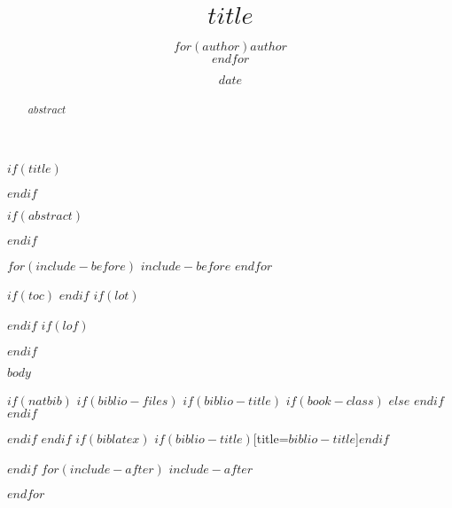 \documentclass[$if(fontsize)$$fontsize$,$endif$$if(lang)$$lang$,$endif$$if(papersize)$$papersize$,$endif$$for(classoption)$$classoption$$sep$,$endfor$]{$documentclass$}
\title{\textbf{\LARGE{$title$}}}
\title{}
\author{$for(author)$$author$ \\ $endfor$}
\author{}
\date{$date$}
\date{}
\begin{document}



$if(title)$
\maketitle
$endif$

\newpage
{} %

$if(abstract)$
\begin{abstract}
$abstract$
\end{abstract}
$endif$

$for(include-before)$
$include-before$
$endfor$


$if(toc)$
{
\hypersetup{linkcolor=black}
\setcounter{tocdepth}{$toc-depth$}
\tableofcontents
}
$endif$
$if(lot)$
\listoftables
$endif$
$if(lof)$
\listoffigures
$endif$

\newpage
{} %

$body$

$if(natbib)$
$if(biblio-files)$
$if(biblio-title)$
$if(book-class)$
\renewcommand\bibname{$biblio-title$}
$else$
\renewcommand\refname{$biblio-title$}
$endif$
$endif$


$endif$
$endif$
$if(biblatex)$
\printbibliography$if(biblio-title)$[title=$biblio-title$]$endif$

$endif$
$for(include-after)$
$include-after$

$endfor$
\end{document}
